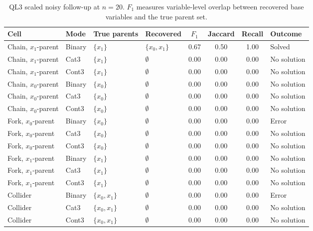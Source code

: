 \begin{table}[htbp]
\centering
\scriptsize
\caption{QL3 scaled noisy follow-up at \(n=20\). \(F_1\) measures variable-level overlap between recovered base variables and the true parent set.}
\label{tab:ql3-results}
\begin{tabular}{llllcccl}
\toprule
Cell & Mode & True parents & Recovered & \(F_1\) & Jaccard & Recall & Outcome \\
\midrule
Chain, \(x_1\)-parent & Binary & \(\{x_1\}\) & \(\{x_0,x_1\}\) & 0.67 & 0.50 & 1.00 & Solved \\
Chain, \(x_1\)-parent & Cat3 & \(\{x_1\}\) & \(\emptyset\) & 0.00 & 0.00 & 0.00 & No solution \\
Chain, \(x_1\)-parent & Cont3 & \(\{x_1\}\) & \(\emptyset\) & 0.00 & 0.00 & 0.00 & No solution \\
Chain, \(x_0\)-parent & Binary & \(\{x_0\}\) & \(\emptyset\) & 0.00 & 0.00 & 0.00 & No solution \\
Chain, \(x_0\)-parent & Cat3 & \(\{x_0\}\) & \(\emptyset\) & 0.00 & 0.00 & 0.00 & No solution \\
Chain, \(x_0\)-parent & Cont3 & \(\{x_0\}\) & \(\emptyset\) & 0.00 & 0.00 & 0.00 & No solution \\
Fork, \(x_0\)-parent & Binary & \(\{x_0\}\) & \(\emptyset\) & 0.00 & 0.00 & 0.00 & Error \\
Fork, \(x_0\)-parent & Cat3 & \(\{x_0\}\) & \(\emptyset\) & 0.00 & 0.00 & 0.00 & No solution \\
Fork, \(x_0\)-parent & Cont3 & \(\{x_0\}\) & \(\emptyset\) & 0.00 & 0.00 & 0.00 & No solution \\
Fork, \(x_1\)-parent & Binary & \(\{x_1\}\) & \(\emptyset\) & 0.00 & 0.00 & 0.00 & No solution \\
Fork, \(x_1\)-parent & Cat3 & \(\{x_1\}\) & \(\emptyset\) & 0.00 & 0.00 & 0.00 & No solution \\
Fork, \(x_1\)-parent & Cont3 & \(\{x_1\}\) & \(\emptyset\) & 0.00 & 0.00 & 0.00 & No solution \\
Collider & Binary & \(\{x_0,x_1\}\) & \(\emptyset\) & 0.00 & 0.00 & 0.00 & Error \\
Collider & Cat3 & \(\{x_0,x_1\}\) & \(\emptyset\) & 0.00 & 0.00 & 0.00 & No solution \\
Collider & Cont3 & \(\{x_0,x_1\}\) & \(\emptyset\) & 0.00 & 0.00 & 0.00 & No solution \\
\bottomrule
\end{tabular}
\end{table}

